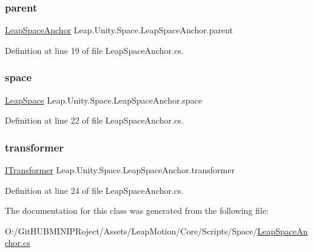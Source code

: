 \subsubsection{\texorpdfstring{parent}{parent}}
{\footnotesize\ttfamily \mbox{\hyperlink{class_leap_1_1_unity_1_1_space_1_1_leap_space_anchor}{Leap\+Space\+Anchor}} Leap.\+Unity.\+Space.\+Leap\+Space\+Anchor.\+parent}



Definition at line 19 of file Leap\+Space\+Anchor.\+cs.

\mbox{\label{class_leap_1_1_unity_1_1_space_1_1_leap_space_anchor_a77daae8f1a9f57ef4dc3e75fe5801bcd}} 
\subsubsection{\texorpdfstring{space}{space}}
{\footnotesize\ttfamily \mbox{\hyperlink{class_leap_1_1_unity_1_1_space_1_1_leap_space}{Leap\+Space}} Leap.\+Unity.\+Space.\+Leap\+Space\+Anchor.\+space}



Definition at line 22 of file Leap\+Space\+Anchor.\+cs.

\mbox{\label{class_leap_1_1_unity_1_1_space_1_1_leap_space_anchor_a6f98d35d75f83e2ff2c978715520c836}} 
\subsubsection{\texorpdfstring{transformer}{transformer}}
{\footnotesize\ttfamily \mbox{\hyperlink{interface_leap_1_1_unity_1_1_space_1_1_i_transformer}{I\+Transformer}} Leap.\+Unity.\+Space.\+Leap\+Space\+Anchor.\+transformer}



Definition at line 24 of file Leap\+Space\+Anchor.\+cs.



The documentation for this class was generated from the following file\+:\begin{DoxyCompactItemize}
\item 
O\+:/\+Git\+H\+U\+B\+M\+I\+N\+I\+P\+Roject/\+Assets/\+Leap\+Motion/\+Core/\+Scripts/\+Space/\mbox{\hyperlink{_leap_space_anchor_8cs}{Leap\+Space\+Anchor.\+cs}}\end{DoxyCompactItemize}
